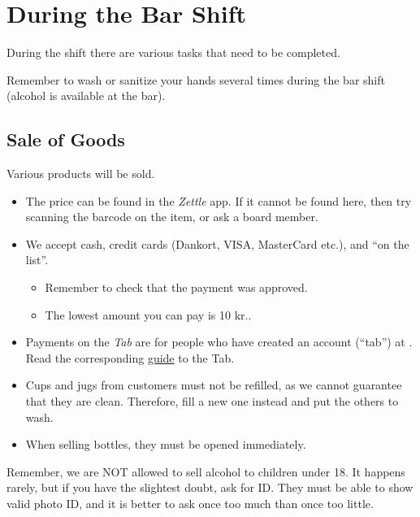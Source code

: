 \section{During the Bar Shift}
\label{sec:during}

During the shift there are various tasks that need to be completed.

Remember to wash or sanitize your hands several times during the bar shift
(alcohol is available at the bar).

\subsection{Sale of Goods}
\label{sec:intra:sale}

Various products will be sold.
\begin{itemize}
    \item The price can be found in the \textit{Zettle} app. If it cannot be found here,
    then try scanning the barcode on the item, or ask a board member.
    \item We accept cash, credit cards (Dankort, VISA, MasterCard
    etc.), and ``on the list''.
    \begin{itemize}
    \item Remember to check that the payment was approved.
    \item The lowest amount you can pay is 10 kr..
    \end{itemize}
    \item Payments on the \textit{Tab} are for people who have created an account
    (``tab'') at \fredagscafeen. 
    Read the corresponding \href{https://media.fredagscafeen.dk/guides/krydsliste.pdf}{guide} to the Tab.
    \item Cups and jugs from customers must not be refilled, as we cannot guarantee that they are clean.
    Therefore, fill a new one instead and put the others to wash.
    \item When selling bottles, they must be opened immediately.
\end{itemize}

Remember, we are NOT allowed to sell alcohol to children under 18.
It happens rarely, but if you have the slightest doubt, ask for ID.
They must be able to show valid photo ID, and it is better to ask once too much than once too little.

